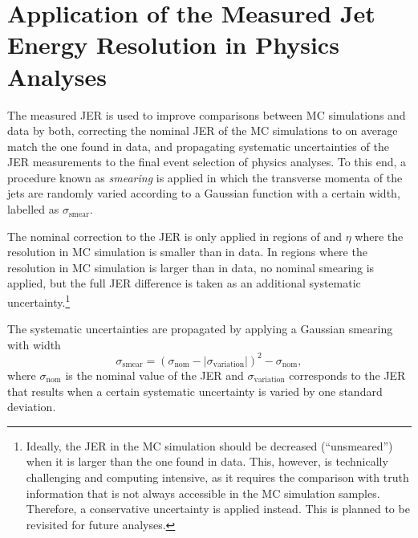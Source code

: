 
\section{Application of the Measured Jet Energy Resolution in Physics Analyses}
\label{sec:jer-in-analysis}
The measured JER is used to improve comparisons between MC simulations and data by both, correcting the nominal JER of the MC simulations to on average match the one found in data, and propagating systematic uncertainties of the JER measurements to the final event selection of physics analyses.
To this end, a procedure known as \emph{smearing} is applied in which the transverse momenta of the jets are randomly varied according to a Gaussian function with a certain width, labelled as $\sigma_{\text{smear}}$.

The nominal correction to the JER is only applied in regions of \pT and $\eta$ where the resolution in MC simulation is smaller than in data. In regions where the resolution in MC simulation is larger than in data, no nominal smearing is applied, but the full JER difference is taken as an additional systematic uncertainty.\footnote{Ideally, the JER in the MC simulation should be decreased (``unsmeared'') when it is larger than the one found in data. This, however, is technically challenging and computing intensive, as it requires the comparison with truth information that is not always accessible in the MC simulation samples. Therefore, a conservative uncertainty is applied instead. This is planned to be revisited for future analyses.}

The systematic uncertainties are propagated by applying a Gaussian smearing with width
\begin{equation}
    \sigma_{\text{smear}} =  \left( \sigma_{\text{nom}} - |\sigma_{\text{variation}}|   \right)^2  - \sigma_{\text{nom}},
\end{equation}
where $\sigma_{\text{nom}}$ is the nominal value of the JER and $\sigma_{\text{variation}}$ corresponds to the JER that results when a certain systematic uncertainty is varied by one standard deviation.

